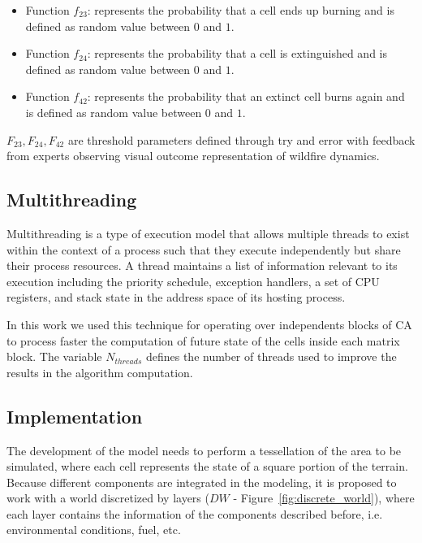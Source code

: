 \documentclass[conference]{IEEEtran}
\begin{document}
\begin{itemize}
          \item Function $f_{23}$: represents the probability that a cell ends up burning and is defined 
            as random value between $0$ and $1$.
          \item Function $f_{24}$: represents the probability that a cell is extinguished and is defined 
            as random value between $0$ and $1$.
          \item Function $f_{42}$: represents the probability that an extinct cell burns again and is 
            defined as random value between $0$ and $1$.
        \end{itemize}
        
        $F_{23}, F_{24}, F_{42}$ are threshold parameters defined through try and error with feedback 
        from experts observing visual outcome representation of wildfire dynamics.
            
    \subsection{Multithreading}
  
      Multithreading is a type of execution model that allows multiple threads to exist within the context of a process 
      such that they execute independently but share their process resources. A thread maintains a list of information 
      relevant to its execution including the priority schedule, exception handlers, a set of CPU registers, and stack 
      state in the address space of its hosting process.
      
      In this work we used this technique for operating over independents blocks of CA to process faster the computation
      of future state of the cells inside each matrix block. The variable $N_{threads}$ defines the number of threads
      used to improve the results in the algorithm computation.
    

    \subsection{Implementation}
    
      The development of the model needs to perform a tessellation of the area to be simulated, where each 
      cell represents the state of a square portion of the terrain. Because different components are integrated 
      in the modeling, it is proposed to work with a world discretized by layers ($DW$ - 
      Figure~\ref{fig:discrete_world}), where each layer contains the information of the components described 
      before, i.e. environmental conditions, fuel, etc. 
\end{document}
